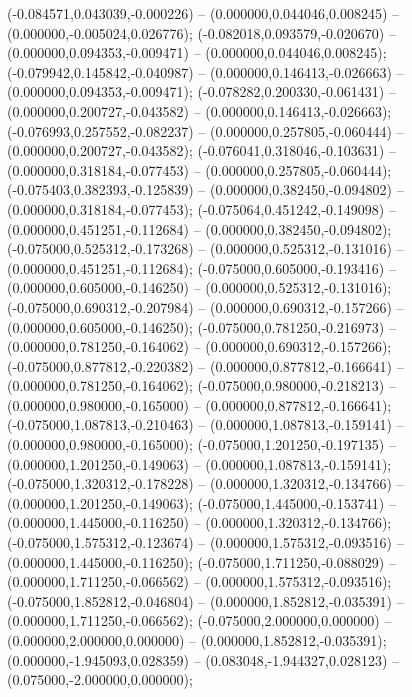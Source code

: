  (-0.084571,0.043039,-0.000226) -- (0.000000,0.044046,0.008245) -- (0.000000,-0.005024,0.026776);
 (-0.082018,0.093579,-0.020670) -- (0.000000,0.094353,-0.009471) -- (0.000000,0.044046,0.008245);
 (-0.079942,0.145842,-0.040987) -- (0.000000,0.146413,-0.026663) -- (0.000000,0.094353,-0.009471);
 (-0.078282,0.200330,-0.061431) -- (0.000000,0.200727,-0.043582) -- (0.000000,0.146413,-0.026663);
 (-0.076993,0.257552,-0.082237) -- (0.000000,0.257805,-0.060444) -- (0.000000,0.200727,-0.043582);
 (-0.076041,0.318046,-0.103631) -- (0.000000,0.318184,-0.077453) -- (0.000000,0.257805,-0.060444);
 (-0.075403,0.382393,-0.125839) -- (0.000000,0.382450,-0.094802) -- (0.000000,0.318184,-0.077453);
 (-0.075064,0.451242,-0.149098) -- (0.000000,0.451251,-0.112684) -- (0.000000,0.382450,-0.094802);
 (-0.075000,0.525312,-0.173268) -- (0.000000,0.525312,-0.131016) -- (0.000000,0.451251,-0.112684);
 (-0.075000,0.605000,-0.193416) -- (0.000000,0.605000,-0.146250) -- (0.000000,0.525312,-0.131016);
 (-0.075000,0.690312,-0.207984) -- (0.000000,0.690312,-0.157266) -- (0.000000,0.605000,-0.146250);
 (-0.075000,0.781250,-0.216973) -- (0.000000,0.781250,-0.164062) -- (0.000000,0.690312,-0.157266);
 (-0.075000,0.877812,-0.220382) -- (0.000000,0.877812,-0.166641) -- (0.000000,0.781250,-0.164062);
 (-0.075000,0.980000,-0.218213) -- (0.000000,0.980000,-0.165000) -- (0.000000,0.877812,-0.166641);
 (-0.075000,1.087813,-0.210463) -- (0.000000,1.087813,-0.159141) -- (0.000000,0.980000,-0.165000);
 (-0.075000,1.201250,-0.197135) -- (0.000000,1.201250,-0.149063) -- (0.000000,1.087813,-0.159141);
 (-0.075000,1.320312,-0.178228) -- (0.000000,1.320312,-0.134766) -- (0.000000,1.201250,-0.149063);
 (-0.075000,1.445000,-0.153741) -- (0.000000,1.445000,-0.116250) -- (0.000000,1.320312,-0.134766);
 (-0.075000,1.575312,-0.123674) -- (0.000000,1.575312,-0.093516) -- (0.000000,1.445000,-0.116250);
 (-0.075000,1.711250,-0.088029) -- (0.000000,1.711250,-0.066562) -- (0.000000,1.575312,-0.093516);
 (-0.075000,1.852812,-0.046804) -- (0.000000,1.852812,-0.035391) -- (0.000000,1.711250,-0.066562);
 (-0.075000,2.000000,0.000000) -- (0.000000,2.000000,0.000000) -- (0.000000,1.852812,-0.035391);
 (0.000000,-1.945093,0.028359) -- (0.083048,-1.944327,0.028123) -- (0.075000,-2.000000,0.000000);
